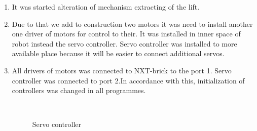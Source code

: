 \begin{enumerate}
\begin{enumerate}
		\item It was started alteration of mechanism extracting of the lift.
		
		\item Due to that we add to construction two motors it was need to install another one driver of motors for control to their. It was installed in inner space of robot instead the servo controller. Servo controller was installed to more available place because it will be easier to connect additional servos.
		
		\item All drivers of motors was connected to NXT-brick to the port 1. Servo controller was connected to port 2.In accordance with this, initialization of controllers was changed in all programmes.
		
		\begin{figure}[H]
			\begin{minipage}[h]{0.2\linewidth}
				\center  
			\end{minipage}
			\begin{minipage}[h]{0.6\linewidth}
				\caption{Servo controller}
			\end{minipage}
		\end{figure}
		
	\end{enumerate}
	

\end{enumerate}
